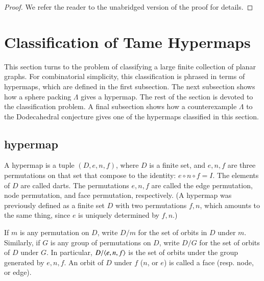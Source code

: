 \documentclass{article} %
\begin{document}
\begin{proof}



We refer the reader to the unabridged version of the proof for details.
\end{proof}



\section{Classification of Tame Hypermaps}

This section turns to the problem of classifying a large finite collection
of planar graphs. For combinatorial simplicity, this classification is phrased
in terms of hypermaps, which are defined in the first subsection.
The next subsection shows how a sphere packing $\Lambda$ gives a hypermap.
The rest of the section is devoted to the classification problem.
A final subsection shows how a counterexample $\Lambda$ to the Dodecahedral
conjecture gives one of the hypermaps classified in this section.

\subsection{hypermap}

A hypermap is a tuple $(D,e,n,f)$, where $D$ is a finite
set, and $e,n,f$ are three permutations on that set that
compose to the identity:
$e\circ n\circ f = I$.  The elements of $D$ are called darts.
The permutations $e,n,f$ are called the edge permutation,
node permutation, and face permutation, respectively.
(A hypermap was previously defined as a finite set $D$ with
two permutations $f,n$, which amounts to the same thing,
since $e$ is uniquely determined by $f,n$.)

If $m$ is any permutation on $D$, write $D/m$ for the
set of orbits in $D$ under $m$.  Similarly, if $G$ is any
group of permutations on $D$, write $D/G$ for the set
of orbits of $D$ under $G$.  In particular, $D/\langle e,n,f\rangle$
is the set of orbits under the group generated by $e,n,f$.
An orbit of $D$ under $f$ ($n$, or $e$) is called a face (resp.
node, or edge).
\end{document}
